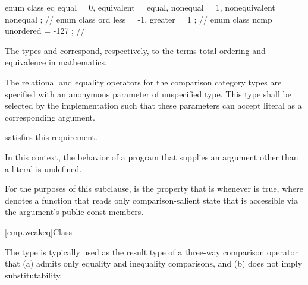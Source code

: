\begin{codeblock}
enum class eq { equal = 0, equivalent = equal,
                nonequal = 1, nonequivalent = nonequal };   // \expos
enum class ord { less = -1, greater = 1 };                  // \expos
enum class ncmp { unordered = -127 };                       // \expos
\end{codeblock}

\pnum
\begin{note}
The types  and 
correspond, respectively, to the terms
total ordering and equivalence in mathematics.
\end{note}

\pnum
The relational and equality operators for the comparison category types
are specified with an anonymous parameter of unspecified type.
This type shall be selected by the implementation such that
these parameters can accept literal  as a corresponding argument.
\begin{example}
satisfies this requirement.
\end{example}
In this context, the behavior of a program that supplies
an argument other than a literal  is undefined.

\pnum
For the purposes of this subclause,
 is the property that  is 
whenever  is true,
where  denotes a function that reads only comparison-salient state
that is accessible via the argument's public const members.

[cmp.weakeq]{Class }

\pnum
The  type is typically used
as the result type of a three-way comparison operator
that (a) admits only equality and inequality comparisons,
and (b) does not imply substitutability.

